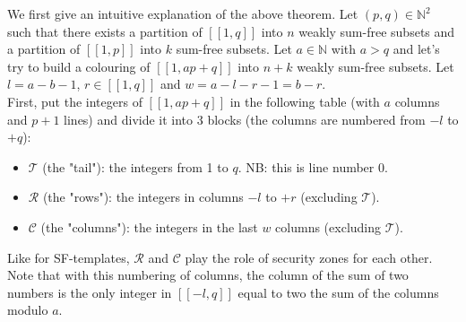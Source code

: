 We first give an intuitive explanation of the above theorem. Let \((p, q) \in \mathbb{N}^2\) such that there exists a partition of \([\![1,q]\!]\) into \(n\) weakly sum-free
subsets and a partition of \([\![1,p]\!]\) into \(k\) sum-free subsets. Let \(a \in \mathbb{N}\) with \(a > q\) and let's try to build a colouring of \([\![1, ap + q]\!]\)
into \(n + k\) weakly sum-free subsets. Let \(l = a - b - 1\), \(r \in [\![1,q]\!]\) and \(w = a - l - r - 1 = b - r\). \\

First, put the integers of \([\![1, ap + q]\!]\) in the following table (with \(a\) columns and \(p + 1\) lines) and divide it into 3 blocks (the columns are numbered from \(-l\) to \(+q\)):

\begin{itemize}
	\item \(\mathcal{T}\) (the "tail"): the integers from 1 to \(q\). NB: this is line number 0.
	\item \(\mathcal{R}\) (the "rows"): the integers in columns \(-l\) to \(+r\) (excluding  \(\mathcal{T}\)).
	\item \(\mathcal{C}\) (the "columns"): the integers in the last \(w\) columns (excluding  \(\mathcal{T}\)).
\end{itemize}

Like for SF-templates, \(\mathcal{R}\) and \(\mathcal{C}\) play the role of security zones for each other. Note that with
this numbering of columns, the column of the sum of two numbers is the only integer in \([\![-l,q]\!]\) equal to two the
sum of the columns modulo \(a\).

